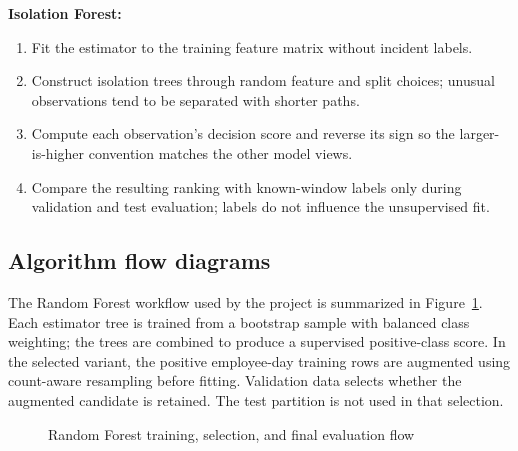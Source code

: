 \documentclass[12pt,a4paper,oneside]{report}
\begin{document}
\textbf{Isolation Forest:}
\begin{enumerate}
  \item Fit the estimator to the training feature matrix without
        incident labels.
  \item Construct isolation trees through random feature and split
        choices; unusual observations tend to be separated with shorter
        paths.
  \item Compute each observation's decision score and reverse its sign
        so the larger-is-higher convention matches the other model views.
  \item Compare the resulting ranking with known-window labels only
        during validation and test evaluation; labels do not influence
        the unsupervised fit.
\end{enumerate}


\subsection{Algorithm flow diagrams}
The Random Forest workflow used by the project is summarized in
Figure~\ref{fig:random-forest-flow}. Each estimator tree is trained from
a bootstrap sample with balanced class weighting; the trees are
combined to produce a supervised positive-class score. In the selected
variant, the positive employee-day training rows are augmented using
count-aware resampling before fitting. Validation data selects whether
the augmented candidate is retained. The test partition is not used in
that selection.

\begin{figure}[!htbp]
\centering
{}
\caption{Random Forest training, selection, and final evaluation flow}
\label{fig:random-forest-flow}
\end{figure}
\end{document}
